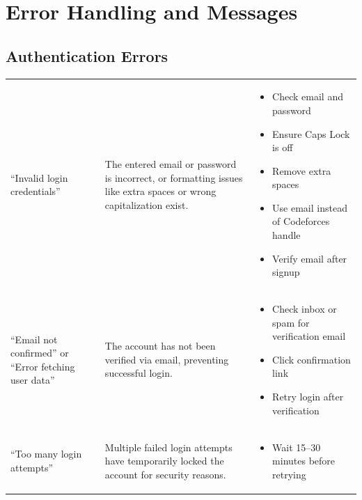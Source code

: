 \documentclass[12pt]{article}
\begin{document}
\section{Error Handling and Messages}
\subsection{Authentication Errors}
\begin{table}[h]
\centering
\label{tab:login-errors-revised}

\begin{tabularx}{\textwidth}{>{\raggedright\arraybackslash}p{4cm}
>{\raggedright\arraybackslash}p{5cm}
>{\raggedright\arraybackslash}X}
\toprule
\multicolumn{1}{c}{\textbf{Error Message}} &
\multicolumn{1}{c}{\textbf{Possible Cause}} &
\multicolumn{1}{c}{\textbf{Solutions}} \\
\midrule

\vspace{0.3pt}``Invalid login credentials'' 
& \vspace{0.3pt}The entered email or password is incorrect, or formatting issues like extra spaces or wrong capitalization exist.
& \begin{itemize}
\item Check email and password
\item Ensure Caps Lock is off
\item Remove extra spaces
\item Use email instead of Codeforces handle
\item Verify email after signup
\end{itemize} \\ 

\vspace{0.3pt}``Email not confirmed'' or ``Error fetching user data''
& \vspace{0.3pt}The account has not been verified via email, preventing successful login.
& \begin{itemize}
\item Check inbox or spam for verification email
\item Click confirmation link
\item Retry login after verification
\end{itemize} \\ 

\vspace{0.3pt}``Too many login attempts''
& \vspace{0.3pt}Multiple failed login attempts have temporarily locked the account for security reasons.
& \begin{itemize}
\item Wait 15--30 minutes before retrying
\end{itemize} \\ 


\end{tabularx}
\end{table}
\end{document}
